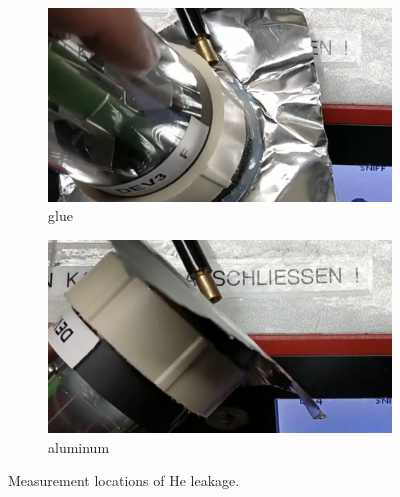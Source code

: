 \begin{figure}[ht]
	\begin{subfigure}[b]{0.4\textwidth}
		\includegraphics[width=\textwidth]{./Chapters/CRT-handling/glue}
		\caption{glue}
	\end{subfigure}
	\hspace{0.1\textwidth}
	\begin{subfigure}[b]{0.4\textwidth}
		\includegraphics[width=\textwidth]{./Chapters/CRT-handling/aluminum_foil}
		\caption{aluminum}
	\end{subfigure}
	
	\caption{Measurement locations of He leakage.}
	\label{fig:Measurement locatiosn of He leakage}
\end{figure}
 


